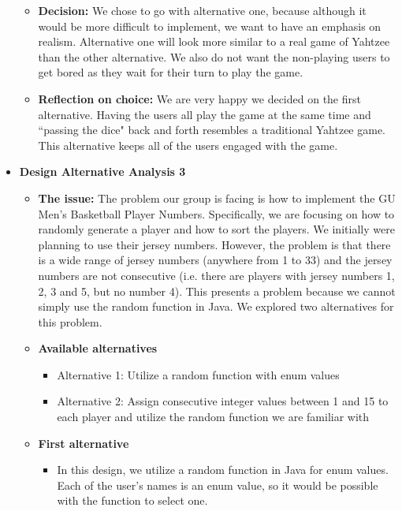 \documentclass[]{report}   %
\begin{document}
\begin{itemize}
\begin{itemize}
	\item \textbf{Decision:} We chose to go with alternative one, because although it would be more difficult to implement, we want to have an emphasis on realism. Alternative one will look more similar to a real game of Yahtzee than the other alternative. We also do not want the non-playing users to get bored as they wait for their turn to play the game.
	\item \textbf{Reflection on choice:} We are very happy we decided on the first alternative. Having the users all play the game at the same time and ``passing the dice" back and forth resembles a traditional Yahtzee game. This alternative keeps all of the users engaged with the game. \\
	\end{itemize}

	\vspace {1in}

\item \textbf{Design Alternative Analysis 3}
	\begin{itemize}
	\item \textbf{The issue:} The problem our group is facing is how to implement the GU Men's Basketball Player Numbers. Specifically, we are focusing on how to randomly generate a player and how to sort the players. We initially were planning to use their jersey numbers. However, the problem is that there is a wide range of jersey numbers (anywhere from 1 to 33) and the jersey numbers are not consecutive (i.e. there are players with jersey numbers 1, 2, 3 and 5, but no number 4). This presents a problem because we cannot simply use the random function in Java. We explored two alternatives for this problem.
	\item \textbf{Available alternatives}
		\begin{itemize}
		\item Alternative 1: Utilize a random function with enum values
		\item Alternative 2: Assign consecutive integer values between 1 and 15 to each player and utilize the random function we are familiar with
		\end{itemize}
	\item \textbf{First alternative}
		\begin{itemize}
		\item In this design, we utilize a random function in Java for enum values. Each of the user's names is an enum value, so it would be possible with the function to select one.
		\end{itemize}


\end{itemize}
\end{itemize}
\end{document}
